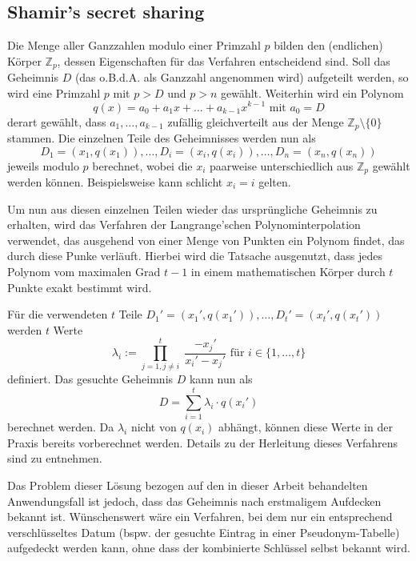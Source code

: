 \subsection*{Shamir's secret sharing}

Die Menge aller Ganzzahlen modulo einer Primzahl \(p\) bilden den (endlichen) Körper \(\mathbb{Z}_p\), dessen Eigenschaften für das Verfahren entscheidend sind. Soll das Geheimnis \(D\) (das o.B.d.A. als Ganzzahl angenommen wird) aufgeteilt werden, so wird eine Primzahl \(p\) mit \(p > D\) und \(p > n\) gewählt. Weiterhin wird ein Polynom 
\[q(x) = a_0 + a_1x + \dots + a_{k-1}x^{k-1} \text{ mit } a_0 = D\] 
derart gewählt, dass \(a_1, \dots, a_{k-1}\) zufällig gleichverteilt aus der Menge \(\mathbb{Z}_p \setminus \{0\}\) stammen. Die einzelnen Teile des Geheimnisses werden nun als
\[D_1=(x_1,q(x_1)), \dots, D_i=(x_i,q(x_i)), \dots, D_n=(x_n,q(x_n))\]
jeweils modulo \(p\) berechnet, wobei die \(x_i\) paarweise unterschiedlich aus \(\mathbb{Z}_p\) gewählt werden können. Beispielsweise kann schlicht \(x_i = i\) gelten.

Um nun aus diesen einzelnen Teilen wieder das ursprüngliche Geheimnis zu erhalten, wird das Verfahren der Langrange'schen Polynominterpolation verwendet, das ausgehend von einer Menge von Punkten ein Polynom findet, das durch diese Punke verläuft. Hierbei wird die Tatsache ausgenutzt, dass jedes Polynom vom maximalen Grad \(t-1\) in einem mathematischen Körper durch \(t\) Punkte exakt bestimmt wird.

Für die verwendeten \(t\) Teile \(D_1'=(x_1',q(x_1')),\dots,D_t'=(x_t',q(x_t'))\) werden \(t\) Werte 
\[\lambda_i := \prod_{j=1, j \not= i}^{t} \; \frac{- x_j'}{x_i' - x_j'} \text{ für } i \in \{1,\dots,t\}\] 
definiert. Das gesuchte Geheimnis \(D\) kann nun als
\[D = \sum_{i=1}^{t}\lambda_i \cdot q(x_i')\]
berechnet werden. Da \(\lambda_i\) nicht von \(q(x_i)\) abhängt, können diese Werte in der Praxis bereits vorberechnet werden. Details zu der Herleitung dieses Verfahrens sind \cite{boneh2016} zu entnehmen.

Das Problem dieser Lösung bezogen auf den in dieser Arbeit behandelten Anwendungsfall ist jedoch, dass das Geheimnis nach erstmaligem Aufdecken bekannt ist. Wünschenswert wäre ein Verfahren, bei dem nur ein entsprechend verschlüsseltes Datum (bspw. der gesuchte Eintrag in einer Pseudonym-Tabelle) aufgedeckt werden kann, ohne dass der kombinierte Schlüssel selbst bekannt wird. 

